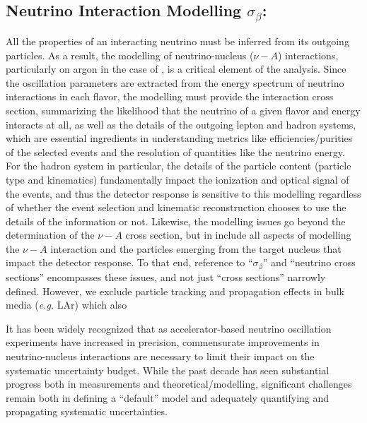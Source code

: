 \subsection{Neutrino Interaction Modelling $\sigma_\beta$:}
All the properties of an interacting neutrino must be inferred from its outgoing particles. As a result, the modelling of neutrino-nucleus ($\nu-A$) interactions, particularly on argon in the case of , is a critical element of the analysis. Since the oscillation parameters are extracted from the energy spectrum of neutrino interactions in each flavor, the modelling must provide the interaction cross section, summarizing the likelihood that the neutrino of a given flavor and energy interacts at all, as well as the details of the outgoing lepton and hadron systems, which are essential ingredients in understanding metrics like efficiencies/purities of the selected events and the resolution of quantities like the neutrino energy. For the hadron system in particular, the details of the particle content (particle type and kinematics) fundamentally impact the ionization and optical signal of the events, and thus the detector response is sensitive to this modelling regardless of whether the event selection and kinematic reconstruction chooses to use the details of the information or not.
Likewise, the modelling issues go beyond the determination of the $\nu-A$ cross section, but in include all aspects of modelling the $\nu-A$ interaction and the particles emerging from the target nucleus that impact the detector response. To that end, reference to ``$\sigma_\beta$'' and ``neutrino cross sections'' encompasses these issues, and not just ``cross sections'' narrowly defined. However, we exclude particle tracking and propagation effects in bulk media ({\em e.g.} LAr) which also  

It has been widely recognized that as accelerator-based neutrino oscillation experiments have increased in precision, commensurate improvements in neutrino-nucleus interactions are necessary to limit their impact on the systematic uncertainty budget. While the past decade has seen substantial progress both in measurements and theoretical/modelling, significant challenges remain both in defining a ``default'' model and adequately quantifying and propagating systematic uncertainties.

